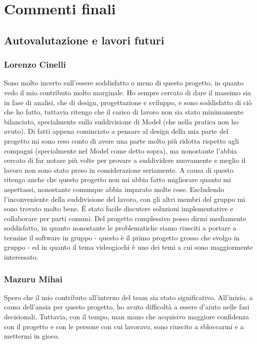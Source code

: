 \documentclass[a4paper,12pt]{report}
\begin{document}
\chapter{Commenti finali}

\section{Autovalutazione e lavori futuri}

\subsection{Lorenzo Cinelli}

Sono molto incerto sull'essere soddisfatto o meno di questo progetto, in quanto vedo il mio contributo molto marginale. Ho sempre cercato di dare il massimo sia in fase di analisi,
che di design, progettazione e sviluppo, e sono soddisfatto di ciò che ho fatto, tuttavia ritengo che il carico di lavoro non sia stato minimamente bilanciato, specialmente sulla
suddivisione di Model (che nella pratica non ho avuto). Di fatti appena cominciato a pensare al design della mia parte del progetto mi sono reso conto di avere una parte molto più
ridotta rispetto agli compagni (specialmente nel Model come detto sopra), ma nonostante l'abbia cercato di far notare più volte per provare a suddividere nuovamente e meglio il lavoro
non sono stato preso in considerazione seriamente. 
A causa di questo ritengo anche che questo progetto non mi abbia fatto migliorare quanto mi aspettassi, nonostante comunque abbia imparato molte cose.
Escludendo l'inconveniente della suddivisione del lavoro, con gli altri membri del gruppo mi sono trovato molto bene. È stato facile discutere soluzioni implementative e collaborare
per parti comuni.
Del progetto complessivo posso dirmi mediamente soddisfatto, in quanto nonostante le problematiche siamo riusciti a portare a termine il software in gruppo - questo è il primo
progetto grosso che svolgo in gruppo - ed in quanto il tema videogiochi è uno dei temi a cui sono maggiormente interessato. 

\subsection{Mazuru Mihai}
Spero che il mio contributo all'interno del team sia stato significativo. All'inizio, a causa dell'ansia per questo progetto, ho avuto difficoltà a essere d'aiuto nelle fasi decisionali. Tuttavia, con il tempo, man mano che acquisivo maggiore confidenza con il progetto e con le persone con cui lavoravo, sono riuscito a sbloccarmi e a mettermi in gioco.
\end{document}
